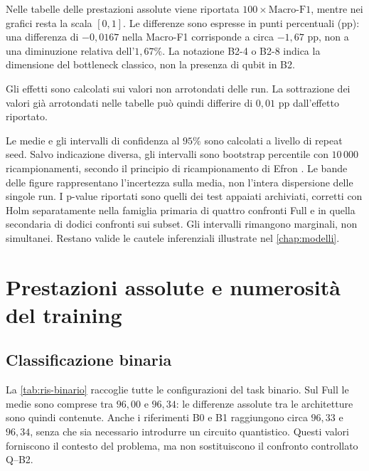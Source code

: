 Nelle tabelle delle prestazioni assolute viene riportata
\(100\times\text{Macro-F1}\), mentre nei grafici resta la scala
\([0,1]\). Le differenze sono espresse in punti percentuali
(pp): una differenza di \(-0{,}0167\) nella Macro-F1 corrisponde
a circa \(-1{,}67\) pp, non a una diminuzione relativa dell'\(1{,}67\%\).
La notazione B2-4 o B2-8 indica la dimensione del bottleneck classico,
non la presenza di qubit in B2.

Gli effetti sono calcolati sui valori non arrotondati delle run.
La sottrazione dei valori già arrotondati nelle tabelle può quindi
differire di \(0{,}01\) pp dall'effetto riportato.

Le medie e gli intervalli di confidenza al \(95\%\) sono calcolati
a livello di repeat seed. Salvo indicazione diversa, gli intervalli
sono bootstrap percentile con \(10\,000\) ricampionamenti, secondo
il principio di ricampionamento di Efron \cite{efron1979bootstrap}. Le bande
delle figure rappresentano l'incertezza sulla media, non l'intera
dispersione delle singole run. I p-value riportati sono quelli dei
test appaiati archiviati, corretti con Holm \cite{holm1979multiple}
separatamente nella
famiglia primaria di quattro confronti Full e in quella secondaria
di dodici confronti sui subset. Gli intervalli rimangono marginali,
non simultanei. Restano valide le cautele inferenziali illustrate
nel \cref{chap:modelli}.

\section{Prestazioni assolute e numerosità del training}
\label{sec:ris-prestazioni}

\subsection{Classificazione binaria}

La \cref{tab:ris-binario} raccoglie tutte le configurazioni del task
binario. Sul Full le medie sono comprese tra \(96{,}00\) e
\(96{,}34\): le differenze assolute tra le architetture sono quindi
contenute. Anche i riferimenti B0 e B1 raggiungono circa \(96{,}33\)
e \(96{,}34\), senza che sia necessario introdurre un circuito
quantistico. Questi valori forniscono il contesto del problema,
ma non sostituiscono il confronto controllato Q--B2.

